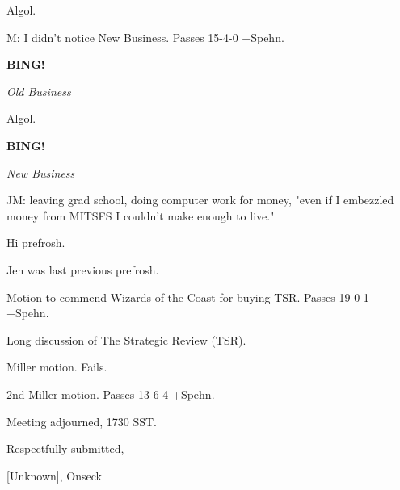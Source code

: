 \documentclass[12pt]{article}
\newcommand{\bing}{{\bf BING!} }
\newcommand{\goto}[1]{\bing \vskip 12pt \centerline{{\em{#1}}}}
\begin{document}
Algol.

M: I didn't notice New Business. Passes 15-4-0 +Spehn.

\goto{Old Business}

Algol.

\goto{New Business}

JM: leaving grad school, doing computer work for money, "even if I embezzled money from MITSFS I couldn't make enough to live."

Hi prefrosh.

Jen was last previous prefrosh.

Motion to commend Wizards of the Coast for buying TSR. Passes 19-0-1 +Spehn.

Long discussion of The Strategic Review (TSR).

Miller motion. Fails.

2nd Miller motion. Passes 13-6-4 +Spehn.

\vspace{12pt}

\noindent
Meeting adjourned, 1730 SST.

\vspace{18pt}

\centerline{Respectfully submitted,}
\centerline{[Unknown], Onseck}
\end{document}
